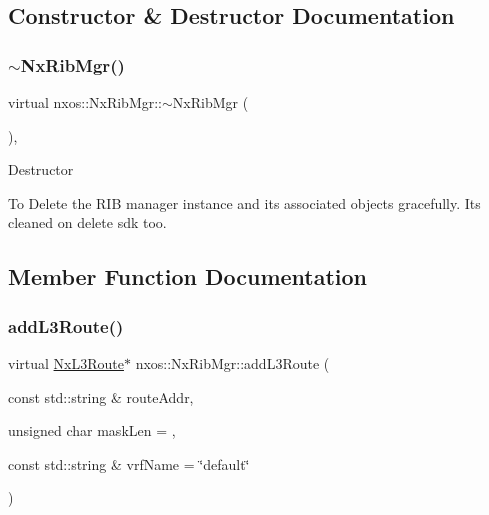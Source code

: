 \subsection{Constructor \& Destructor Documentation}
\mbox{\label{classnxos_1_1_nx_rib_mgr_a5f390bcc244b9f5984d35290aea0e2cc}} 
\subsubsection{\texorpdfstring{$\sim$\+Nx\+Rib\+Mgr()}{~NxRibMgr()}}
{\footnotesize\ttfamily virtual nxos\+::\+Nx\+Rib\+Mgr\+::$\sim$\+Nx\+Rib\+Mgr (\begin{DoxyParamCaption}{ }\end{DoxyParamCaption})\hspace{0.3cm}{\ttfamily [inline]}, {\ttfamily [virtual]}}

Destructor

To Delete the R\+IB manager instance and its associated objects gracefully. Its cleaned on delete sdk too. 

\subsection{Member Function Documentation}
\mbox{\label{classnxos_1_1_nx_rib_mgr_a59da8782bb5d41a130c8c238abc92bc3}} 
\subsubsection{\texorpdfstring{add\+L3\+Route()}{addL3Route()}}
{\footnotesize\ttfamily virtual \mbox{\hyperlink{classnxos_1_1_nx_l3_route}{Nx\+L3\+Route}}$\ast$ nxos\+::\+Nx\+Rib\+Mgr\+::add\+L3\+Route (\begin{DoxyParamCaption}\item[{const std\+::string \&}]{route\+Addr,  }\item[{unsigned char}]{mask\+Len = {},  }\item[{const std\+::string \&}]{vrf\+Name = {\ttfamily \char`\"{}default\char`\"{}} }\end{DoxyParamCaption})\hspace{0.3cm}{\ttfamily [pure virtual]}}

